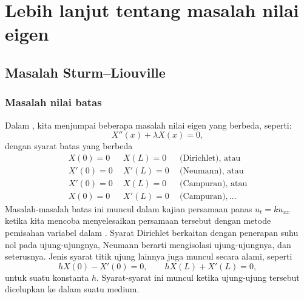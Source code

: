 \chapter{Lebih lanjut tentang masalah nilai eigen} \label{SL:chapter}


\section{Masalah Sturm--Liouville}
\label{slproblems:section}



\subsection{Masalah nilai batas}

Dalam ,
kita menjumpai beberapa masalah nilai eigen yang berbeda, seperti:
\begin{equation*}
X''(x) + \lambda X(x) = 0 ,
\end{equation*}
dengan syarat batas yang berbeda
%
%
\begin{equation*}
\begin{array}{rrl}
X(0) = 0 & ~~X(L) = 0 & ~~\text{(Dirichlet), atau} \\
X'(0) = 0 & ~~X'(L) = 0 & ~~\text{(Neumann), atau} \\
X'(0) = 0 & ~~X(L) = 0 & ~~\text{(Campuran), atau} \\
X(0) = 0 & ~~X'(L) = 0 & ~~\text{(Campuran)}, \ldots
\end{array}
\end{equation*}
Masalah-masalah batas ini muncul dalam kajian persamaan panas $u_t =
k u_{xx}$ ketika kita mencoba menyelesaikan persamaan tersebut dengan metode
pemisahan variabel dalam .
Syarat Dirichlet berkaitan dengan penerapan
suhu nol pada ujung-ujungnya, Neumann berarti mengisolasi ujung-ujungnya, dan seterusnya.
Jenis syarat titik ujung lainnya juga muncul secara alami, seperti
\emph{}
\begin{equation*}
hX(0) - X'(0) = 0, \qquad hX(L) + X'(L) = 0 ,
\end{equation*}
untuk suatu konstanta $h$.  Syarat-syarat ini muncul ketika ujung-ujung tersebut dicelupkan
ke dalam suatu medium.

